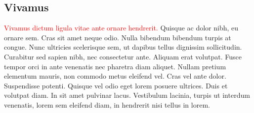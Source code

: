 \documentclass[final,los,index,glossary,loa]{ryethesis}
\begin{document}
{\subsection{Vivamus}
\textcolor{red}{Vivamus dictum ligula vitae ante ornare hendrerit.} Quisque ac dolor nibh, eu ornare sem. Cras sit amet neque odio. Nulla bibendum bibendum turpis at congue. Nunc ultricies scelerisque sem, ut dapibus tellus dignissim sollicitudin. Curabitur sed sapien nibh, nec consectetur ante. Aliquam erat volutpat. Fusce tempor orci in ante venenatis nec pharetra diam aliquet. Nullam pretium elementum mauris, non commodo metus eleifend vel. Cras vel ante dolor. Suspendisse potenti. Quisque vel odio eget lorem posuere ultrices. Duis et volutpat diam. In sit amet pulvinar lacus. Vestibulum lacinia, turpis ut interdum venenatis, lorem sem eleifend diam, in hendrerit nisi tellus in lorem.
}

\typeout{**************************************************************************}
\typeout{}
\typeout{}
\typeout{}
\typeout{}
\typeout{}
\typeout{}
\typeout{}
\typeout{}
\typeout{}
\typeout{**************************************************************************}
\end{document}
